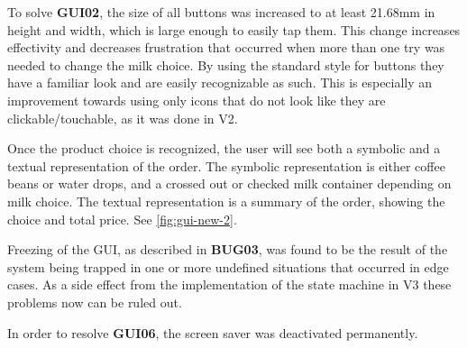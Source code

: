 \documentclass[12pt]{article}
\begin{document}
To solve \textbf{GUI02}, the size of all buttons was increased to at least 21.68mm in height and width,
which is large enough to easily tap them. This change increases effectivity and decreases frustration that occurred when more than one try was needed to change the milk choice.
By using the standard style for buttons they have a familiar look and are easily recognizable as such.
This is especially an improvement towards using only icons that do not look like they are clickable/touchable, as it was done in V2.

Once the product choice is recognized, 
the user will see both a symbolic and a textual representation of the order.
The symbolic representation is either coffee beans or water drops, and a crossed out or checked milk container depending on milk choice.
The textual representation is a summary of the order, showing the choice and total price. See \autoref{fig:gui-new-2}.

Freezing of the GUI, as described in \textbf{BUG03},
was found to be the result of the system being trapped in one or more undefined situations that occurred in edge cases.
As a side effect from the implementation of the state machine in V3 these problems now can be ruled out.

In order to resolve \textbf{GUI06}, the screen saver was deactivated permanently.
\end{document}
